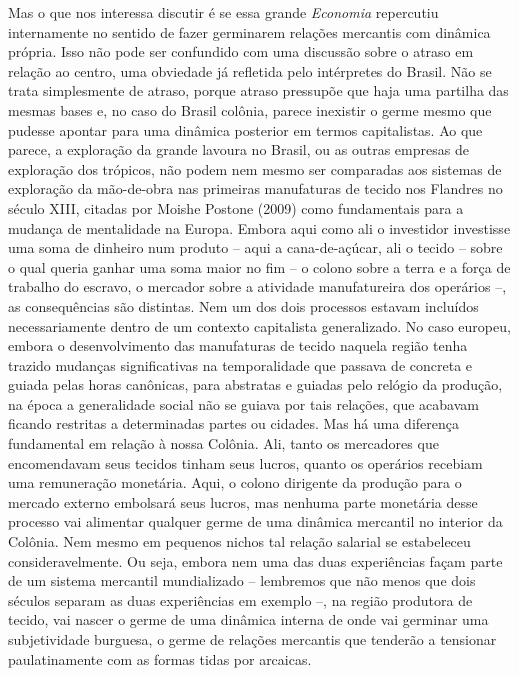 Mas o que nos interessa discutir é se essa grande \emph{Economia}
repercutiu internamente no sentido de fazer germinarem relações
mercantis com dinâmica própria. Isso não pode ser confundido com uma
discussão sobre o atraso em relação ao centro, uma obviedade já
refletida pelo intérpretes do Brasil. Não se trata simplesmente de
atraso, porque atraso pressupõe que haja uma partilha das mesmas bases
e, no caso do Brasil colônia, parece inexistir o germe mesmo que pudesse
apontar para uma dinâmica posterior em termos capitalistas. Ao que
parece, a exploração da grande lavoura no Brasil, ou as outras empresas
de exploração dos trópicos, não podem nem mesmo ser comparadas aos
sistemas de exploração da mão-de-obra nas primeiras manufaturas de
tecido nos Flandres no século XIII, citadas por Moishe Postone (2009)
como fundamentais para a mudança de mentalidade na Europa. Embora aqui
como ali o investidor investisse uma soma de dinheiro num produto --
aqui a cana-de-açúcar, ali o tecido -- sobre o qual queria ganhar uma
soma maior no fim -- o colono sobre a terra e a força de trabalho do
escravo, o mercador sobre a atividade manufatureira dos operários --, as
consequências são distintas. Nem um dos dois processos estavam incluídos
necessariamente dentro de um contexto capitalista generalizado. No caso
europeu, embora o desenvolvimento das manufaturas de tecido naquela
região tenha trazido mudanças significativas na temporalidade que
passava de concreta e guiada pelas horas canônicas, para abstratas e
guiadas pelo relógio da produção, na época a generalidade social não se
guiava por tais relações, que acabavam ficando restritas a determinadas
partes ou cidades. Mas há uma diferença fundamental em relação à nossa
Colônia. Ali, tanto os mercadores que encomendavam seus tecidos tinham
seus lucros, quanto os operários recebiam uma remuneração monetária.
Aqui, o colono dirigente da produção para o mercado externo embolsará
seus lucros, mas nenhuma parte monetária desse processo vai alimentar
qualquer germe de uma dinâmica mercantil no interior da Colônia. Nem
mesmo em pequenos nichos tal relação salarial se estabeleceu
consideravelmente. Ou seja, embora nem uma das duas experiências façam
parte de um sistema mercantil mundializado -- lembremos que não menos
que dois séculos separam as duas experiências em exemplo --, na região
produtora de tecido, vai nascer o germe de uma dinâmica interna de onde
vai germinar uma subjetividade burguesa, o germe de relações mercantis
que tenderão a tensionar paulatinamente com as formas tidas por
arcaicas.

